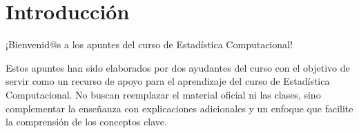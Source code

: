 \section{Introducción}

¡Bienvenid@s a los apuntes del curso de Estadística Computacional!

Estos apuntes han sido elaborados por dos ayudantes del curso con el objetivo
de servir como un recurso de apoyo para el aprendizaje del curso de Estadística Computacional.
No buscan reemplazar el material oficial ni las clases, sino complementar la enseñanza
con explicaciones adicionales y un enfoque que facilite la comprensión de los conceptos clave.
